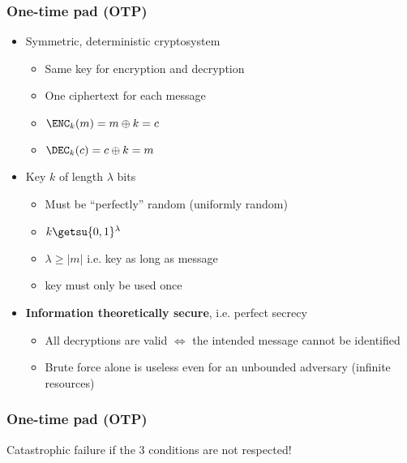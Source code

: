 \begin{frame}
  \frametitle{One-time pad (OTP)}

  \begin{itemize}[<+->]
    \item Symmetric, deterministic cryptosystem
    \begin{itemize}
      \item Same key for encryption and decryption
      \item One ciphertext for each message
      \item $\ENC_k(m) = m \oplus k = c$
      \item $\DEC_k(c) = c \oplus k = m$
    \end{itemize}
    \vspace*{1em}
    \item Key $k$ of length $\lambda$ bits
    \begin{itemize}
      \item Must be \enquote{perfectly} random (uniformly random)
      \item $k\getsu\{0,1\}^\lambda$
      \item $\lambda \ge \lvert m\rvert$ i.e. key as long as message 
      \item key must only be used once
    \end{itemize}
    \vspace*{1em}
    \item \textbf{Information theoretically secure}, i.e. perfect secrecy
    \begin{itemize}
      \item All decryptions are valid $\iff$ the intended message cannot be identified
      \item Brute force alone is useless even for an unbounded adversary (infinite resources)
    \end{itemize}
  \end{itemize}
\end{frame}

\begin{frame}
  \frametitle{One-time pad (OTP)}
  \begin{center}
    {\color{red} Catastrophic failure if the 3 conditions are not respected!}
  \end{center}
\end{frame}

